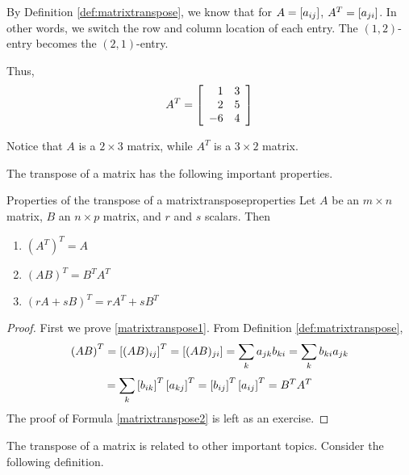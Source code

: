 \begin{solution}
By Definition \ref{def:matrixtranspose}, we know that for $A = \left[ a_{ij} \right]$, 
$A^T = \left[ a_{ji} \right]$. In other words, we switch the row and column
location of each entry. The $\left( 1, 2 \right)$-entry becomes the $\left( 2,1 \right)$-entry.

Thus, 
\begin{equation*}
A^T = 
 \left[
\begin{array}{rr}
1 & 3 \\
2 & 5 \\
-6 & 4
\end{array}
\right] 
\end{equation*}

Notice that $A$ is a $2 \times 3$ matrix, while $A^T$ is a $3 \times 2$ matrix. 
\end{solution}

The transpose of a matrix has the following important properties.

\begin{lemma}{Properties of the transpose of a matrix}{transposeproperties}
Let $A$ be an $m\times n$ matrix, $B$ an $n\times p$ matrix, and $r$ and $s$ scalars. Then
\begin{enumerate}
\item
$\left(A^{T}\right)^{T} = A$
\item
$\left( AB\right) ^{T}=B^{T}A^{T} $ \label{matrixtranspose1}
\item
$\left( rA+ sB\right) ^{T}=rA^{T}+ sB^{T}$  \label{matrixtranspose2}
\end{enumerate}
\end{lemma}

\begin{proof}
First we prove \ref{matrixtranspose1}. From Definition \ref{def:matrixtranspose},
\begin{equation*}
\left(AB\right)^{T} = \left[ (AB) _{ij} \right] ^{T}=\left[ (AB)_{ji} \right]=\sum_{k}a_{jk}b_{ki}= \sum_{k}b_{ki}a_{jk} 
\end{equation*}
\begin{equation*}
= \sum_{k}\left[ b_{ik}\right]^{T}\left[
a_{kj}\right]^{T}=\left[ b_{ij}\right] ^{T} \left[ a_{ij}\right]^{T} = B^{T}A^{T} 
\end{equation*}
The proof of Formula \ref{matrixtranspose2} is left as an exercise. 
\end{proof}

The transpose of a matrix is related to other important topics. Consider the following definition.  

